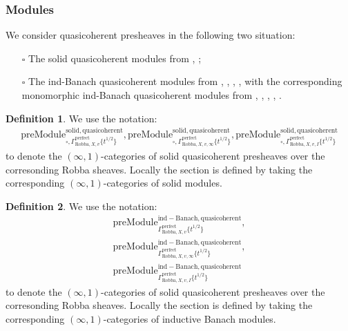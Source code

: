 \documentclass[12pt]{book}
\theoremstyle{definition}
\newtheorem{definition}{Definition}
\begin{document}
\subsubsection{Modules}


\noindent We consider quasicoherent presheaves in the following two situation:
\begin{itemize}
\item[$\square$] The solid quasicoherent modules from \cite{CS1}, \cite{CS2};
\item[$\square$] The ind-Banach quasicoherent modules from \cite{BK}, \cite{BBK}, \cite{BBBK}, \cite{KKM}, \cite{KM} with the corresponding monomorphic ind-Banach quasicoherent modules from \cite{BK}, \cite{BBK}, \cite{BBBK}, \cite{KKM}, \cite{KM}.
\end{itemize}

\begin{definition}
We use the notation:
\begin{align}
\mathrm{preModule}^\mathrm{solid,quasicoherent}_{\square,\Gamma^\mathrm{perfect}_{\text{Robba},X,v}\{t^{1/2}\}},\mathrm{preModule}^\mathrm{solid,quasicoherent}_{\square,\Gamma^\mathrm{perfect}_{\text{Robba},X,v,\infty}\{t^{1/2}\}},
\mathrm{preModule}^\mathrm{solid,quasicoherent}_{\square,\Gamma^\mathrm{perfect}_{\text{Robba},X,v,I}\{t^{1/2}\}} 
\end{align}
to denote the $(\infty,1)$-categories of solid quasicoherent presheaves over the corresonding Robba sheaves. Locally the section is defined by taking the corresponding $(\infty,1)$-categories of solid modules.
\end{definition}

\begin{definition}
We use the notation:
\begin{align}
\mathrm{preModule}^\mathrm{ind-Banach,quasicoherent}_{\Gamma^\mathrm{perfect}_{\text{Robba},X,v}\{t^{1/2}\}},\\\mathrm{preModule}^\mathrm{ind-Banach,quasicoherent}_{\Gamma^\mathrm{perfect}_{\text{Robba},X,v,\infty}\{t^{1/2}\}},\\
\mathrm{preModule}^\mathrm{ind-Banach,quasicoherent}_{\Gamma^\mathrm{perfect}_{\text{Robba},X,v,I}\{t^{1/2}\}} 
\end{align}
to denote the $(\infty,1)$-categories of solid quasicoherent presheaves over the corresonding Robba sheaves. Locally the section is defined by taking the corresponding $(\infty,1)$-categories of inductive Banach  modules. 
\end{definition}
\end{document}
